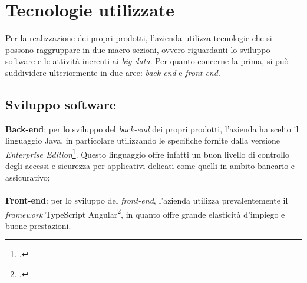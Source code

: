 \section{Tecnologie utilizzate}

Per la realizzazione dei propri prodotti, l'azienda utilizza tecnologie che si possono raggruppare in due macro-sezioni, ovvero riguardanti lo sviluppo software e le attività inerenti ai \textit{big data}.
Per quanto concerne la prima, si può suddividere ulteriormente in due aree: \textit{back-end} e \textit{front-end}.

\subsection{Sviluppo software}
\textbf{Back-end}: per lo sviluppo del \textit{back-end} dei propri prodotti, l'azienda ha scelto il linguaggio Java, in particolare utilizzando le specifiche fornite dalla versione \textit{Enterprise Edition}\footcite{https://www.oracle.com/technetwork/java/javaee}. Questo linguaggio offre infatti un buon livello di controllo degli accessi e sicurezza per applicativi delicati come quelli in ambito bancario e assicurativo;\\\\
\textbf{Front-end}: per lo sviluppo del \textit{front-end}, l'azienda utilizza prevalentemente il \textit{framework} TypeScript Angular\footcite{https://angular.io/}, in quanto offre grande elasticità d'impiego e buone prestazioni. \\

